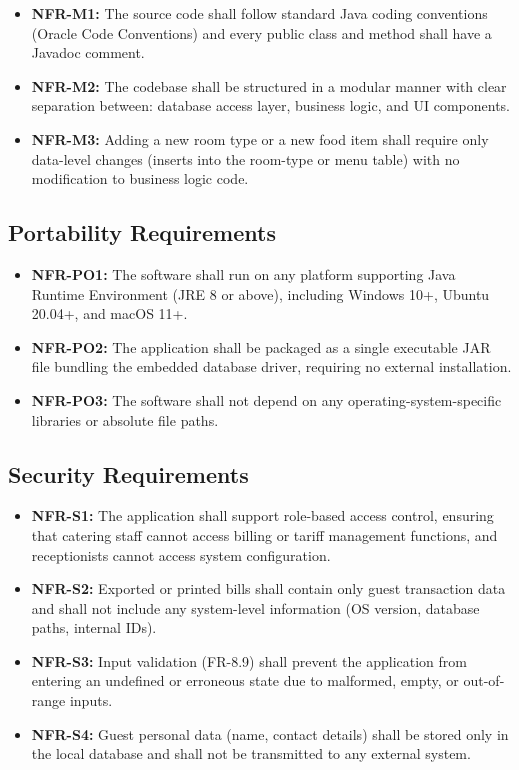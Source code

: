 \documentclass[12pt,a4paper]{article}
\begin{document}
\begin{itemize}[leftmargin=1.5em]
  \item \textbf{NFR-M1:} The source code shall follow standard Java coding conventions
        (Oracle Code Conventions) and every public class and method shall have a Javadoc
        comment.
  \item \textbf{NFR-M2:} The codebase shall be structured in a modular manner with clear
        separation between: database access layer, business logic, and UI components.
  \item \textbf{NFR-M3:} Adding a new room type or a new food item shall require only
        data-level changes (inserts into the room-type or menu table) with no modification
        to business logic code.
\end{itemize}

\subsection{Portability Requirements}

\begin{itemize}[leftmargin=1.5em]
  \item \textbf{NFR-PO1:} The software shall run on any platform supporting Java Runtime
        Environment (JRE 8 or above), including Windows 10+, Ubuntu 20.04+, and macOS 11+.
  \item \textbf{NFR-PO2:} The application shall be packaged as a single executable JAR
        file bundling the embedded database driver, requiring no external installation.
  \item \textbf{NFR-PO3:} The software shall not depend on any operating-system-specific
        libraries or absolute file paths.
\end{itemize}

\subsection{Security Requirements}

\begin{itemize}[leftmargin=1.5em]
  \item \textbf{NFR-S1:} The application shall support role-based access control, ensuring
        that catering staff cannot access billing or tariff management functions, and
        receptionists cannot access system configuration.
  \item \textbf{NFR-S2:} Exported or printed bills shall contain only guest transaction
        data and shall not include any system-level information (OS version, database
        paths, internal IDs).
  \item \textbf{NFR-S3:} Input validation (FR-8.9) shall prevent the application from
        entering an undefined or erroneous state due to malformed, empty, or out-of-range
        inputs.
  \item \textbf{NFR-S4:} Guest personal data (name, contact details) shall be stored only
        in the local database and shall not be transmitted to any external system.
\end{itemize}
\end{document}
